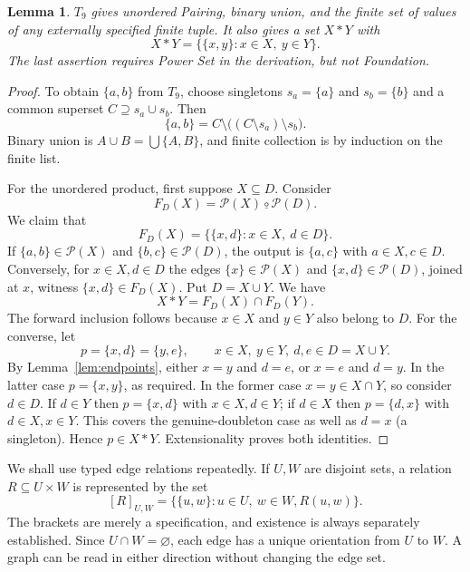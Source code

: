 \documentclass[11pt,a4paper]{article}
\numberwithin{equation}{section}
\newtheorem{lemma}[theorem]{Lemma}
\newcommand{\up}[2]{\{#1,#2\}}
\newcommand{\Comp}{\mathbin{\underline{\circ}}}
\newcommand{\UnProd}{\mathbin{\ast}}
\newcommand{\Pow}{\mathcal P}
\newcommand{\Tnine}{T_9}
\begin{document}
\begin{lemma}\label{lem:pair}
$\Tnine$ gives unordered Pairing, binary union, and the finite set of values of any externally specified finite tuple.  It also gives a set $X\UnProd Y$ with
\[
X\UnProd Y=\{\up xy:x\in X,\ y\in Y\}.
\]
The last assertion requires Power Set in the derivation, but not Foundation.
\end{lemma}
\begin{proof}
To obtain $\up ab$ from $\Tnine$, choose singletons $s_a=\{a\}$ and $s_b=\{b\}$ and a common superset $C\supseteq s_a\cup s_b$.  Then
\[
\up ab=C\setminus\bigl((C\setminus s_a)\setminus s_b\bigr).
\]
Binary union is $A\cup B=\bigcup\up AB$, and finite collection is by induction on the finite list.

For the unordered product, first suppose $X\subseteq D$.  Consider
\[
F_D(X)=\Pow(X)\Comp\Pow(D).
\]
We claim that
\begin{equation}\label{eq:fanD}
F_D(X)=\{\up xd:x\in X,\ d\in D\}.
\end{equation}
If $\up{a}{b}\in\Pow(X)$ and $\up bc\in\Pow(D)$, the output is $\up ac$ with $a\in X,c\in D$.  Conversely, for $x\in X,d\in D$ the edges $\{x\}\in\Pow(X)$ and $\up xd\in\Pow(D)$, joined at $x$, witness $\up xd\in F_D(X)$.  Put $D=X\cup Y$.  We have
\begin{equation}\label{eq:product}
X\UnProd Y=F_D(X)\cap F_D(Y).
\end{equation}
The forward inclusion follows because $x\in X$ and $y\in Y$ also belong to $D$.  For the converse, let
\[
p=\up xd=\up ye,\qquad x\in X,\ y\in Y,\ d,e\in D=X\cup Y.
\]
By Lemma~\ref{lem:endpoints}, either $x=y$ and $d=e$, or $x=e$ and $d=y$.  In the latter case $p=\up xy$, as required.  In the former case $x=y\in X\cap Y$, so consider $d\in D$.  If $d\in Y$ then $p=\up xd$ with $x\in X,d\in Y$; if $d\in X$ then $p=\up dx$ with $d\in X,x\in Y$.  This covers the genuine-doubleton case as well as $d=x$ (a singleton).  Hence $p\in X\UnProd Y$.  Extensionality proves both identities.
\end{proof}

We shall use typed edge relations repeatedly.  If $U,W$ are disjoint sets, a relation $R\subseteq U\times W$ is represented by the set
\[
[R]_{U,W}=\{\up uw:u\in U,\ w\in W,R(u,w)\}.
\]
The brackets are merely a specification, and existence is always separately established.  Since $U\cap W=\varnothing$, each edge has a unique orientation from $U$ to $W$.  A graph can be read in either direction without changing the edge set.
\end{document}
